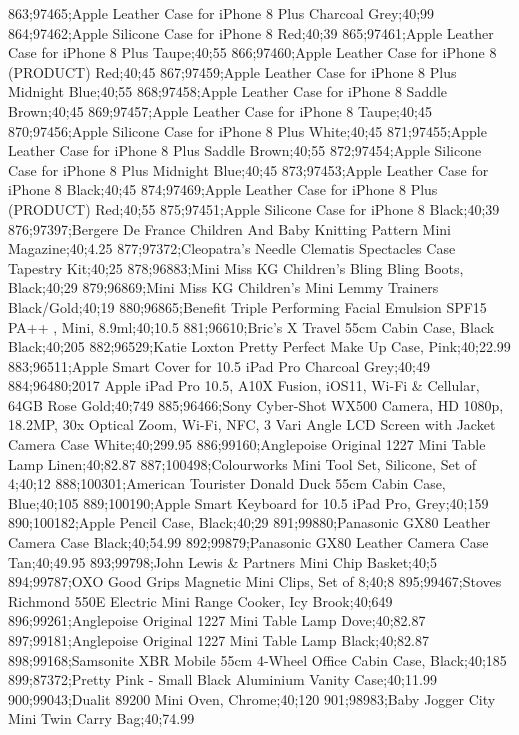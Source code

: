 863;97465;Apple Leather Case for iPhone 8 Plus Charcoal Grey;40;99
864;97462;Apple Silicone Case for iPhone 8 Red;40;39
865;97461;Apple Leather Case for iPhone 8 Plus Taupe;40;55
866;97460;Apple Leather Case for iPhone 8 (PRODUCT) Red;40;45
867;97459;Apple Leather Case for iPhone 8 Plus Midnight Blue;40;55
868;97458;Apple Leather Case for iPhone 8 Saddle Brown;40;45
869;97457;Apple Leather Case for iPhone 8 Taupe;40;45
870;97456;Apple Silicone Case for iPhone 8 Plus White;40;45
871;97455;Apple Leather Case for iPhone 8 Plus Saddle Brown;40;55
872;97454;Apple Silicone Case for iPhone 8 Plus Midnight Blue;40;45
873;97453;Apple Leather Case for iPhone 8 Black;40;45
874;97469;Apple Leather Case for iPhone 8 Plus (PRODUCT) Red;40;55
875;97451;Apple Silicone Case for iPhone 8 Black;40;39
876;97397;Bergere De France Children And Baby Knitting Pattern Mini Magazine;40;4.25
877;97372;Cleopatra's Needle Clematis Spectacles Case Tapestry Kit;40;25
878;96883;Mini Miss KG Children's Bling Bling Boots, Black;40;29
879;96869;Mini Miss KG Children's Mini Lemmy Trainers Black/Gold;40;19
880;96865;Benefit Triple Performing Facial Emulsion SPF15 PA++ , Mini, 8.9ml;40;10.5
881;96610;Bric's X Travel 55cm Cabin Case, Black Black;40;205
882;96529;Katie Loxton Pretty Perfect Make Up Case, Pink;40;22.99
883;96511;Apple Smart Cover for 10.5 iPad Pro Charcoal Grey;40;49
884;96480;2017 Apple iPad Pro 10.5, A10X Fusion, iOS11, Wi-Fi & Cellular, 64GB Rose Gold;40;749
885;96466;Sony Cyber-Shot WX500 Camera, HD 1080p, 18.2MP, 30x Optical Zoom, Wi-Fi, NFC, 3 Vari Angle LCD Screen with Jacket Camera Case White;40;299.95
886;99160;Anglepoise Original 1227 Mini Table Lamp Linen;40;82.87
887;100498;Colourworks Mini Tool Set, Silicone, Set of 4;40;12
888;100301;American Tourister Donald Duck 55cm Cabin Case, Blue;40;105
889;100190;Apple Smart Keyboard for 10.5 iPad Pro, Grey;40;159
890;100182;Apple Pencil Case, Black;40;29
891;99880;Panasonic GX80 Leather Camera Case Black;40;54.99
892;99879;Panasonic GX80 Leather Camera Case Tan;40;49.95
893;99798;John Lewis & Partners Mini Chip Basket;40;5
894;99787;OXO Good Grips Magnetic Mini Clips, Set of 8;40;8
895;99467;Stoves Richmond 550E Electric Mini Range Cooker, Icy Brook;40;649
896;99261;Anglepoise Original 1227 Mini Table Lamp Dove;40;82.87
897;99181;Anglepoise Original 1227 Mini Table Lamp Black;40;82.87
898;99168;Samsonite XBR Mobile 55cm 4-Wheel Office Cabin Case, Black;40;185
899;87372;Pretty Pink - Small Black Aluminium Vanity Case;40;11.99
900;99043;Dualit 89200 Mini Oven, Chrome;40;120
901;98983;Baby Jogger City Mini Twin Carry Bag;40;74.99
